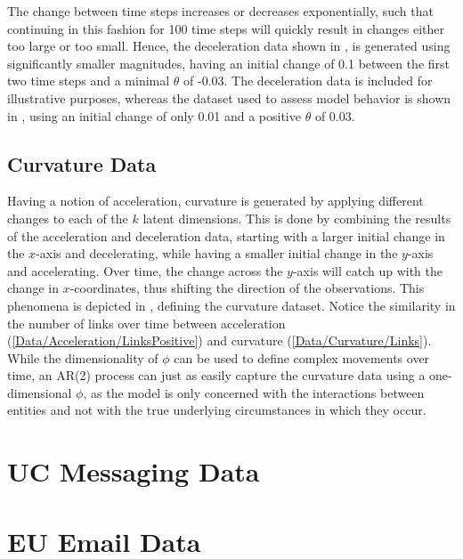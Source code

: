         The change between time steps increases or decreases exponentially, such that continuing in this fashion for 100 time steps will quickly result in changes either too large or too small. Hence, the deceleration data shown in , is generated using significantly smaller magnitudes, having an initial change of 0.1 between the first two time steps and a minimal $\theta$ of -0.03.
        The deceleration data is included for illustrative purposes, whereas the dataset used to assess model behavior is shown in , using an initial change of only 0.01 and a positive $\theta$ of $0.03$.
    
    \subsection{Curvature Data}
    
        Having a notion of acceleration, curvature is generated by applying different changes to each of the $k$ latent dimensions. This is done by combining the results of the acceleration and deceleration data, starting with a larger initial change in the $x$-axis and decelerating, while having a smaller initial change in the $y$-axis and accelerating. Over time, the change across the $y$-axis will catch up with the change in $x$-coordinates, thus shifting the direction of the observations. This phenomena is depicted in , defining the curvature dataset.
        Notice the similarity in the number of links over time between acceleration (\cref{Data/Acceleration/LinksPositive}) and curvature (\cref{Data/Curvature/Links}). While the dimensionality of $\phi$ can be used to define complex movements over time, an AR(2) process can just as easily capture the curvature data using a one-dimensional $\phi$, as the model is only concerned with the interactions between entities and not with the true underlying circumstances in which they occur.
        
\section{UC Messaging Data}

    
\section{EU Email Data}

